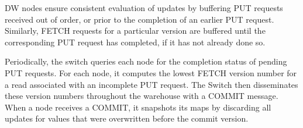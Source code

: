 DW nodes ensure consistent evaluation of updates by buffering PUT requests received out of order, or prior to the completion of an earlier PUT request.  Similarly, FETCH requests for a particular version are buffered until the corresponding PUT request has completed, if it has not already done so.

Periodically, the switch queries each node for the completion status of pending PUT requests.  For each node, it computes the lowest FETCH version number for a read associated with an incomplete PUT request.  The Switch then disseminates these version numbers throughout the warehouse with a COMMIT message.  When a node receives a COMMIT, it snapshots its maps by discarding all updates for values that were overwritten before the commit version.




